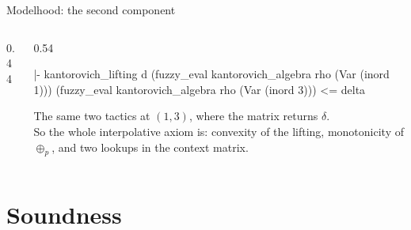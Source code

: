 \documentclass[10pt,aspectratio=169]{beamer}
\begin{document}
            \begin{frame}[fragile]{Modelhood: the second component}
                \begin{columns}[T]
                    \begin{column}{0.44\textwidth}
                    \end{column}
                    \begin{column}{0.54\textwidth}
                        \begin{goalbox}[title={the one remaining goal}]
                            \begin{gconc}
|- kantorovich_lifting d
     (fuzzy_eval kantorovich_algebra rho (Var (inord 1)))
     (fuzzy_eval kantorovich_algebra rho (Var (inord 3)))
   <= delta
                            \end{gconc}
                        \end{goalbox}
                        {\footnotesize The same two tactics at $(1,3)$, where
                            the matrix returns $\delta$. \\[0.4em]
                            So the whole interpolative axiom is: convexity of
                            the lifting, monotonicity of $\oplus_p$, and two
                        lookups in the context matrix.}
                    \end{column}
                \end{columns}
            \end{frame}

            \section{Soundness}
\end{document}

